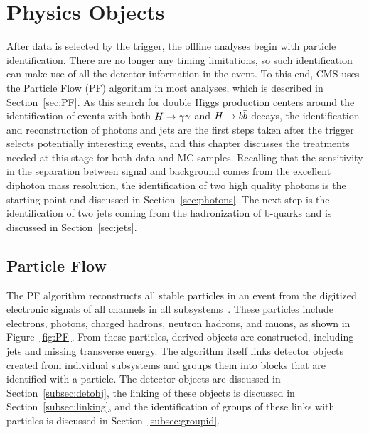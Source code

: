 \chapter{Physics Objects\label{ch:objects}}

After data is selected by the trigger, the offline analyses begin with particle identification.
There are no longer any timing limitations, so such identification can make use of all the detector
information in the event. To this end, CMS uses the Particle Flow (PF) algorithm
in most analyses, which is described in Section~\ref{sec:PF}.
As this search for double Higgs production centers around the identification of
events with both $H\to\gamma\gamma$ and $H\to b\bar{b}$ decays, the
identification and reconstruction of photons and jets are the first steps taken after the
trigger selects potentially interesting events,
and this chapter discusses the treatments needed at this stage for both data and MC samples.
Recalling that the sensitivity in the separation between signal and background comes from the
excellent diphoton mass resolution, the identification of two high quality photons is the starting point
and discussed in Section~\ref{sec:photons}. The next step is the identification of two jets
coming from the hadronization of b-quarks and is discussed in Section~\ref{sec:jets}.


\section{Particle Flow\label{sec:PF}}

The PF algorithm reconstructs all stable particles in an event from the digitized electronic signals
of all channels in all subsystems~\cite{PFPAS2009,CMS-PAS-PFT-10-001}. These particles include
electrons, photons, charged hadrons, neutron hadrons, and muons, as shown in Figure~\ref{fig:PF}.
From these particles, derived objects are constructed, including jets and missing transverse energy.
The algorithm itself links detector objects created from individual subsystems and groups them into
blocks that are identified with a particle. The detector objects are discussed in
Section~\ref{subsec:detobj}, the linking of these objects is discussed in Section~\ref{subsec:linking},
and the identification of groups of these links with particles is discussed in
Section~\ref{subsec:groupid}.

